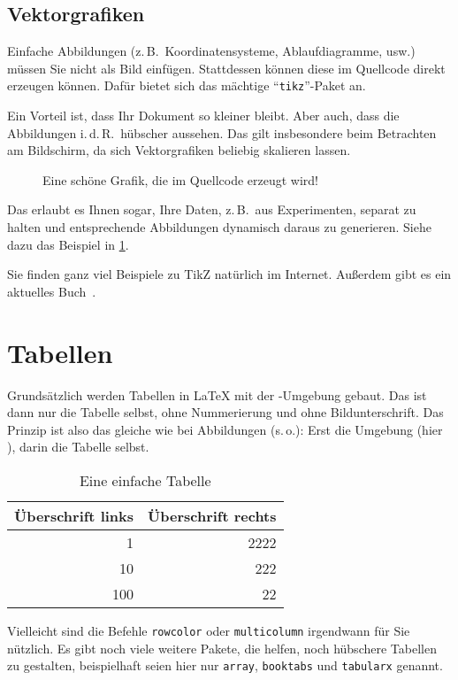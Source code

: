 \subsection{Vektorgrafiken}
\label{sec:vectorGraphcis}
%
Einfache Abbildungen (z.\,B.\ Koordinatensysteme, Ablaufdiagramme, usw.) müssen Sie nicht als Bild einfügen. Stattdessen können diese im Quellcode direkt erzeugen können. Dafür bietet sich das mächtige \enquote{\texttt{tikz}}-Paket an.
\par
Ein Vorteil ist, dass Ihr Dokument so kleiner bleibt. Aber auch, dass die Abbildungen i.\,d.\,R.\ hübscher aussehen. Das gilt insbesondere beim Betrachten am Bildschirm, da sich Vektorgrafiken beliebig skalieren lassen.
%
\begin{figure}[tbh]
\centering

\caption{Eine schöne Grafik, die im Quellcode erzeugt wird!}
\label{fig:plotFleuret}
\end{figure}
%
Das erlaubt es Ihnen sogar, Ihre Daten, z.\,B.\ aus Experimenten, separat zu halten und entsprechende Abbildungen dynamisch daraus zu generieren. Siehe dazu das Beispiel in \cref{fig:plotFleuret}.
\par
Sie finden ganz viel Beispiele zu TikZ natürlich im Internet. Außerdem gibt es ein aktuelles Buch~\cite{kottwitz:tikz}.
%
%
\section{Tabellen}
\label{sec:tables}
Grundsätzlich werden Tabellen in \LaTeX{} mit der -Umgebung gebaut. Das ist dann nur die Tabelle selbst, ohne Nummerierung und ohne Bildunterschrift. Das Prinzip ist also das gleiche wie bei Abbildungen (s.\,o.): Erst die Umgebung (hier ), darin die Tabelle selbst.
%
\begin{table}[tbh]
 \centering
 \begin{tabular}{r|r}
 Überschrift links & Überschrift rechts\\
 \hline
 1   & 2222\\
 10  & 222\\
 100 & 22
 \end{tabular}
 \caption{Eine einfache Tabelle}
 \label{tab:example}
\end{table}
%
Vielleicht sind die Befehle \texttt{rowcolor} oder \texttt{multicolumn} irgendwann für Sie nützlich. Es gibt noch viele weitere Pakete, die helfen, noch hübschere Tabellen zu gestalten, beispielhaft seien hier nur \texttt{array}, \texttt{booktabs} und \texttt{tabularx} genannt.
%
%
